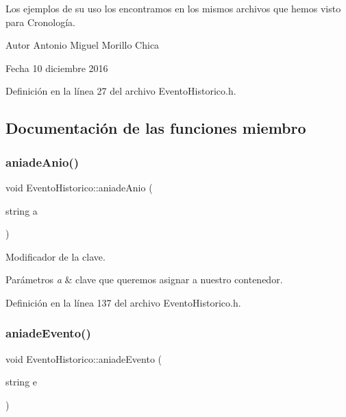 Los ejemplos de su uso los encontramos en los mismos archivos que hemos visto para Cronología.

\begin{DoxyAuthor}{Autor}
Antonio Miguel Morillo Chica 
\end{DoxyAuthor}
\begin{DoxyDate}{Fecha}
10 diciembre 2016 
\end{DoxyDate}


Definición en la línea 27 del archivo Evento\+Historico.\+h.



\subsection{Documentación de las funciones miembro}
\hypertarget{classEventoHistorico_ad7bb99f4afa1b283f965a5ed378a5c14}{}\label{classEventoHistorico_ad7bb99f4afa1b283f965a5ed378a5c14} 
\subsubsection{\texorpdfstring{aniade\+Anio()}{aniadeAnio()}}
{\footnotesize\ttfamily void Evento\+Historico\+::aniade\+Anio (\begin{DoxyParamCaption}\item[{string}]{a }\end{DoxyParamCaption})\hspace{0.3cm}{\ttfamily [inline]}}



Modificador de la clave. 


\begin{DoxyParams}{Parámetros}
{\em a} & clave que queremos asignar a nuestro contenedor. \\
\hline
\end{DoxyParams}


Definición en la línea 137 del archivo Evento\+Historico.\+h.

\hypertarget{classEventoHistorico_aedda8393e5c52b32ee3c3a5cbd58ab37}{}\label{classEventoHistorico_aedda8393e5c52b32ee3c3a5cbd58ab37} 
\subsubsection{\texorpdfstring{aniade\+Evento()}{aniadeEvento()}}
{\footnotesize\ttfamily void Evento\+Historico\+::aniade\+Evento (\begin{DoxyParamCaption}\item[{string}]{e }\end{DoxyParamCaption})\hspace{0.3cm}{\ttfamily [inline]}}



